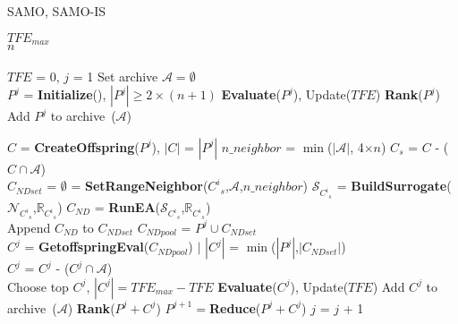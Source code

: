 \begin{algorithm}[!ht]\footnotesize 
	\caption{SAMO, SAMO-IS} 
	\begin{algorithmic}[1] 
		\REQUIRE
		$TFE_{max}$\qquad {}\\ 
		\REQUIRE $n$\qquad
		\\ 
		\\ 
			\STATE $TFE$ = 0, $j$ = 1 \STATE Set archive $\mathcal{A} = \emptyset$ \qquad
		\\ \STATE $P^j$ = \textbf{Initialize}(),
		$\left|P^j\right| \ge 2\times(n+1)$ \STATE \textbf{Evaluate}($P^j$), Update($TFE$) \STATE
		\textbf{Rank}($P^j$) \STATE Add $P^j$ to archive~($\mathcal{A}$)
		
		 \STATE $C$ = \textbf{CreateOffspring}($P^j$), $\left|C\right|$ =
		$\left|P^j\right|$ \STATE $n\_neighbor$ = $\min$($\left|\mathcal{A}\right|$, 4$\times n$) \STATE
		$C_s$ = $C$ - ($C \cap \mathcal{A}$)\qquad {}\\
		\STATE $C_{NDset}$ = $\emptyset$   =
		\textbf{SetRangeNeighbor}(${C^{i}}_s$,$\mathcal{A}$,$n\_neighbor$) \STATE $\mathcal{S}_{{C^{i}}_s}$
		= \textbf{BuildSurrogate}($\mathcal{N}_{{C^{i}}_s}$,$\mathbb{R}_{{C^{i}}_s}$) \STATE $C_{ND}$ =
		\textbf{RunEA}($\mathcal{S}_{{C^{i}}_s}$,$\mathbb{R}_{{C^{i}}_s}$)\\ \STATE Append $C_{ND}$ to
		$C_{NDset}$ \ENDFOR \STATE $C_{NDpool}$ = $P^j \cup C_{NDset}$\qquad {}\\ \STATE $C^j$ =
		\textbf{GetoffspringEval}($C_{NDpool}$) $|$ $\left|C^j\right|$ =
		$\min$($\left|P^j\right|$,$\left|C_{NDset}\right|$)\\ \STATE $C^j$ = $C^j$ - ($C^j \cap
		\mathcal{A}$)\qquad {}\\ {
			\STATE Choose top $C^j$, $|C^j| = TFE_{max} - TFE$ \ENDIF} \STATE \textbf{Evaluate}($C^j$), Update($TFE$) \STATE Add $C^j$ to archive~($\mathcal{A}$) \STATE
		\textbf{Rank}($P^j + C^j$) \STATE $P^{j+1} = $\textbf{Reduce}($P^j + C^j$) \STATE $j$ = $j$ + 1
		\ENDWHILE
		
	\end{algorithmic} 
\label{alg:SAMO} 
\end{algorithm}

